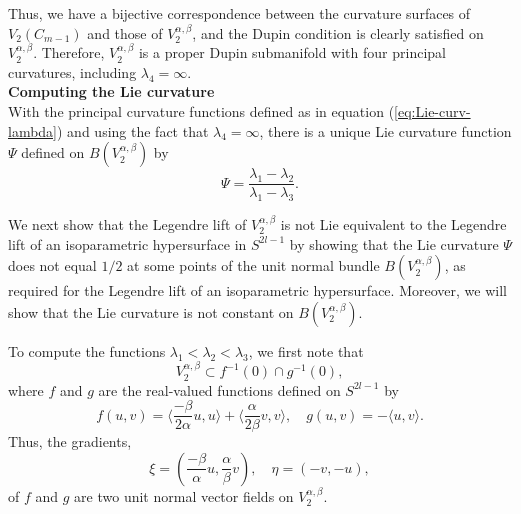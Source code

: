 \documentclass[12pt]{article}
\begin{document}
Thus, we have a bijective correspondence between the curvature surfaces of $V_2 (C_{m-1})$ and those of 
$V^{\alpha,\beta}_2$, and the Dupin condition
is clearly satisfied on $V^{\alpha,\beta}_2$.  Therefore,
$V^{\alpha,\beta}_2$ is a proper Dupin submanifold with four principal curvatures, including $\lambda_4 = \infty$.\\


\noindent
{\bf Computing the Lie curvature}\\

With the principal curvature functions defined as in equation (\ref{eq:Lie-curv-lambda}) and using the fact that 
$\lambda_4 = \infty$, there is a unique 
Lie curvature function $\Psi$ defined on $B(V^{\alpha,\beta}_2)$ by
\begin{equation}
\label{eq:3.7.5-a}
\Psi = \frac{\lambda_1 - \lambda_2}{\lambda_1 - \lambda_3}.
\end{equation} 


We next show that the Legendre lift of $V^{\alpha,\beta}_2$ is not Lie equivalent to the Legendre lift of an isoparametric
hypersurface in $S^{2l-1}$ by showing that the Lie curvature 
$\Psi$ does not equal $1/2$ at some points of
the unit normal bundle $B(V^{\alpha,\beta}_2)$, as required for the Legendre lift of an isoparametric hypersurface.  
Moreover, we will show that the Lie curvature is not constant on $B(V^{\alpha,\beta}_2)$.

To compute the functions $\lambda_1 < \lambda_2 < \lambda_3$, we first note that
\begin{displaymath}
V^{\alpha,\beta}_2 \subset f^{-1}(0) \cap g^{-1}(0),
\end{displaymath}
where $f$ and $g$ are the real-valued functions defined on $S^{2l-1}$ by
\begin{equation}
\label{eq:def-f-g}
f(u,v) = \langle \frac{- \beta}{2 \alpha} u, u \rangle + \langle \frac{\alpha}{2 \beta} v, v \rangle, \quad g(u,v) = - \langle u, v \rangle.
\end{equation}
Thus, the gradients,
\begin{displaymath}
\xi = \left(\frac{- \beta}{\alpha} u, \frac{\alpha}{\beta} v \right), \quad \eta = (-v, -u), 
\end{displaymath}
of $f$ and $g$ are two unit normal vector fields on $V^{\alpha,\beta}_2$.  
\end{document}
